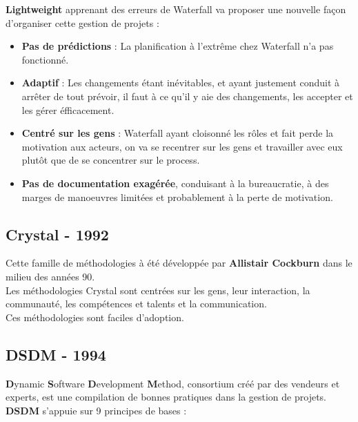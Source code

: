 \documentclass{report}
\begin{document}
		\textbf{Lightweight} apprenant des erreurs de Waterfall va proposer une nouvelle façon d'organiser cette gestion de projets : \\

		\begin{itemize}
			\item \textbf{Pas de prédictions} : La planification à l'extrême chez Waterfall n'a pas fonctionné.
			\item \textbf{Adaptif} : Les changements étant inévitables, et ayant justement conduit à arrêter de tout prévoir, il faut à ce qu'il y aie des changements, les accepter et les gérer éfficacement.
			\item \textbf{Centré sur les gens} : Waterfall ayant cloisonné les rôles et fait perde la motivation aux acteurs, on va se recentrer sur les gens et travailler avec eux plutôt que de se concentrer sur le process.
			\item \textbf{Pas de documentation exagérée}, conduisant à la bureaucratie, à des marges de manoeuvres limitées et probablement à la perte de motivation.\\
		\end{itemize}

		\subsection{Crystal - 1992}

			Cette famille de méthodologies à été développée par \textbf{Allistair Cockburn} dans le milieu des années 90.\\

			Les méthodologies Crystal sont centrées sur les gens, leur interaction, la communauté, les compétences et talents et la communication.\\

			Ces méthodologies sont faciles d'adoption.\\

		\subsection{DSDM - 1994}

			\textbf{D}ynamic \textbf{S}oftware \textbf{D}evelopment \textbf{M}ethod, consortium créé par des vendeurs et experts, est une compilation de bonnes pratiques dans la gestion de projets.\\

			\textbf{DSDM} s'appuie sur 9 principes de bases : \\
\end{document}
